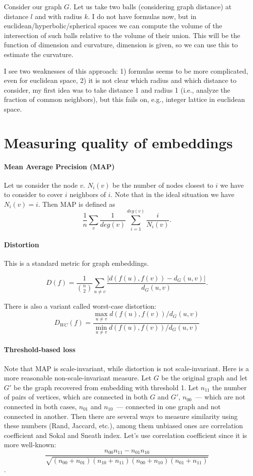 \documentclass{article}
\begin{document}
Consider our graph $G$. Let us take two balls (considering graph distance) at distance $l$ and with radius $k$. I do not have formulas now, but in euclidean/hyperbolic/spherical spaces we can compute the volume of the intersection of such balls relative to the volume of their union. This will be the function of dimension and curvature, dimension is given, so we can use this to estimate the curvature.

I see two weaknesses of this approach: 1) formulas seems to be more complicated, even for euclidean space, 2) it is not clear which radius and which distance to consider, my first idea was to take distance 1 and radius 1 (i.e., analyze the fraction of common neighbors), but this fails on, e.g., integer lattice in euclidean space.


\section{Measuring quality of embeddings}



\paragraph{Mean Average Precision (MAP)}

Let us consider the node $v$. $N_i(v)$ be the number of nodes closest to $i$ we have to consider to cover $i$ neighbors of $i$. Note that in the ideal situation we have $N_i(v) = i$. Then MAP is defined as 
\[
\frac{1}{n} \sum_v \frac{1}{deg(v)} \sum_{i=1}^{deg(v)} \frac{i}{N_i(v)}. 
\]

\paragraph{Distortion} This is a standard metric for graph embeddings.

\[
D(f) = \frac{1}{\binom{n}{2}} \sum_{u \neq v}  \frac{|d(f(u),f(v)) - d_G(u,v)|}{d_G(u,v)}.
\]

There is also a variant called worst-case distortion:
\[
D_{WC}(f) = \frac{\max_{u\neq v}d(f(u),f(v))/d_G(u,v)}{\min_{u\neq v}d(f(u),f(v))/d_G(u,v)} 
\]

\paragraph{Threshold-based loss}

Note that MAP is scale-invariant, while distortion is not scale-invariant. Here is a more reasonable non-scale-invariant measure. Let $G$ be the original graph and let $G'$ be the graph recovered from embedding with threshold 1.
Let $n_{11}$ the number of pairs of vertices, which are connected in both $G$ and $G'$, $n_{00}$~--- which are not connected in both cases, $n_{01}$ and $n_{10}$~--- connected in one graph and not connected in another. Then there are several ways to measure similarity using these numbers (Rand, Jaccard, etc.), among them unbiased ones are correlation coefficient and Sokal and Sneath index. Let's use correlation coefficient since it is more well-known: \[\frac{n_{00}n_{11} - n_{01}n_{10}}{\sqrt{(n_{00} + n_{01})(n_{10} + n_{11})(n_{00} + n_{10})(n_{01} + n_{11})}}\].
\end{document}

